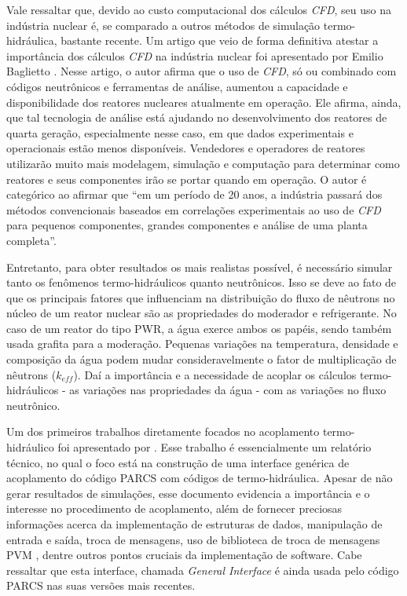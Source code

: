 Vale ressaltar que, devido ao custo computacional dos cálculos \textit{CFD}, seu uso na indústria
nuclear é, se comparado a outros métodos de simulação termo-hidráulica, bastante recente. Um artigo que
veio de forma definitiva atestar a importância dos cálculos \textit{CFD} na indústria nuclear
foi apresentado por Emilio Baglietto \cite{Baglietto2011}. Nesse artigo, o autor afirma
que o uso de \textit{CFD}, só ou combinado com códigos neutrônicos e ferramentas
de análise, aumentou a capacidade e disponibilidade dos reatores nucleares
atualmente em operação. Ele afirma,
ainda, que tal tecnologia de análise está ajudando no desenvolvimento dos reatores
de quarta geração, especialmente nesse caso, em que dados experimentais e operacionais
estão menos disponíveis. Vendedores e operadores de reatores utilizarão muito mais
modelagem, simulação e computação para determinar como reatores e seus componentes
irão se portar quando em operação. O autor é categórico ao afirmar que ``em um
período de 20 anos, a indústria passará dos métodos convencionais baseados em
correlações experimentais ao uso de \textit{CFD} para pequenos componentes, grandes componentes
e análise de uma planta completa''. 

Entretanto, para obter resultados os mais realistas possível, é necessário simular 
tanto os fenômenos termo-hidráulicos quanto neutrônicos. Isso 
se deve ao fato de que os principais fatores que influenciam na distribuição do fluxo de 
nêutrons no núcleo de um reator nuclear são as propriedades do moderador e refrigerante. No caso de um
reator do tipo PWR, a água exerce ambos os papéis, sendo também usada grafita para 
a moderação. Pequenas variações na temperatura, densidade e composição 
da água podem mudar consideravelmente o fator de multiplicação de nêutrons ($k_{eff}$). Daí a importância e 
a necessidade de acoplar os cálculos termo-hidráulicos - as variações nas propriedades da água - com as variações 
no fluxo neutrônico.


Um dos primeiros trabalhos diretamente focados no 
acoplamento termo-hidráulico foi apresentado por \cite{Barber98}. Esse trabalho 
é essencialmente um relatório técnico, no qual o foco está na construção de uma interface 
genérica de acoplamento do código PARCS com códigos de termo-hidráulica. Apesar de não 
gerar resultados de simulações, esse documento evidencia a importância e o interesse 
no procedimento de acoplamento, além de fornecer preciosas informações acerca da 
implementação de estruturas de dados, manipulação de entrada e saída, troca de mensagens, 
uso de biblioteca de troca de mensagens PVM \cite{Geist94}, dentre outros pontos cruciais
da implementação de software. Cabe ressaltar que esta interface, 
chamada \textit{General Interface} é ainda usada pelo código PARCS nas suas versões mais 
recentes. 

